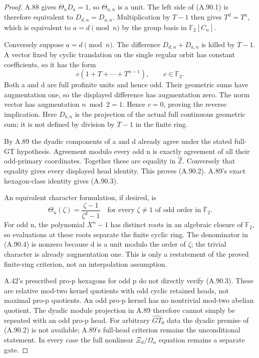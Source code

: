 \begin{proof}
A.88 gives \(\Theta_uD_a=1\), so \(\Theta_{u,n}\) is a unit.
The left side of (A.90.1) is therefore equivalent to
\(D_{d,n}=D_{a,n}\). Multiplication by \(T-1\) then gives
\(T^d=T^a\), which is equivalent to \(a=d\pmod n\) by the
group basis in \(\mathbb F_2[C_n]\).

Conversely suppose \(a=d\pmod n\). The difference
\(D_{d,n}+D_{a,n}\) is killed by \(T-1\). A vector fixed by
cyclic translation on the single regular orbit has constant
coefficients, so it has the form
\[
                    c(1+T+\cdots+T^{n-1}),\qquad c\in\mathbb F_2.
\]
Both a and d are full profinite units and hence odd. Their
geometric sums have augmentation one, so the displayed
difference has augmentation zero. The norm vector has
augmentation \(n\bmod2=1\). Hence \(c=0\), proving the
reverse implication. Here \(D_{b,n}\) is the projection of
the actual full continuous geometric sum; it is not defined
by division by \(T-1\) in the finite ring.

By A.89 the dyadic components of a and d already agree under
the stated full-GT hypothesis. Agreement modulo every odd n
is exactly agreement of all their odd-primary coordinates.
Together these are equality in \(\widehat{\mathbb Z}\).
Conversely that equality gives every displayed head identity.
This proves (A.90.2). A.89's exact hexagon-class identity gives
(A.90.3).

An equivalent character formulation, if desired, is
\[
 \Theta_u(\zeta)=\frac{\zeta-1}{\zeta^d-1}
       \quad\text{for every }\zeta\ne1
       \text{ of odd order in }\overline{\mathbb F}_2.
 \tag{A.90.4}
\]
For odd n, the polynomial \(X^n-1\) has distinct roots in
an algebraic closure of \(\mathbb F_2\), so evaluations at
these roots separate the finite cyclic ring. The denominator
in (A.90.4) is nonzero because d is a unit modulo the order
of \(\zeta\); the trivial character is already augmentation
one. This is only a restatement of the proved finite-ring
criterion, not an interpolation assumption.

A.42's prescribed pro-p hexagons for odd p do not directly
verify (A.90.3). These are relative mod-two kernel quotients
with odd cyclic retained heads, not maximal pro-p quotients.
An odd pro-p kernel has no nontrivial mod-two abelian
quotient. The dyadic module projection in A.89 therefore
cannot simply be repeated with an odd pro-p head.
For arbitrary \(\widehat{GT}_0\) data the dyadic premise of
(A.90.2) is not available; A.89's full-head criterion remains
the unconditional statement. In every case the full nonlinear
\(\Xi_d/\Omega_\alpha\) equation remains a separate gate.
\end{proof}
